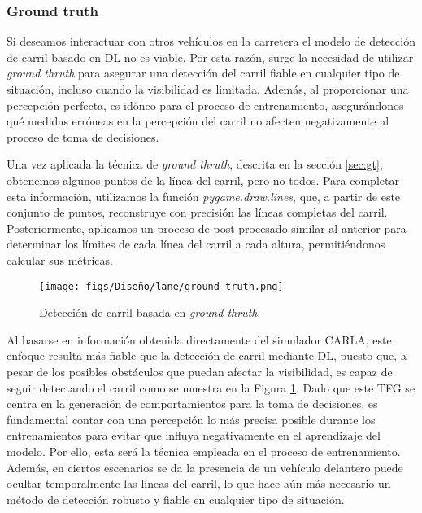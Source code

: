 \subsubsection{Ground truth}

Si deseamos interactuar con otros vehículos en la carretera el modelo de detección de carril basado en \ac{DL} no es viable. Por esta razón, surge la necesidad de utilizar \textit{ground thruth} para asegurar una detección del carril fiable en cualquier tipo de situación, incluso cuando la visibilidad es limitada. Además, al proporcionar una percepción perfecta, es idóneo para el proceso de entrenamiento, asegurándonos qué medidas erróneas en la percepción del carril no afecten negativamente al proceso de toma de decisiones. 

Una vez aplicada la técnica de \textit{ground thruth}, descrita en la sección \ref{sec:gt}, obtenemos algunos puntos de la línea del carril, pero no todos. Para completar esta información, utilizamos la función \textit{pygame.draw.lines}, que, a partir de este conjunto de puntos, reconstruye con precisión las líneas completas del carril. Posteriormente, aplicamos un proceso de post-procesado similar al anterior para determinar los límites de cada línea del carril a cada altura, permitiéndonos calcular sus métricas.

\begin{figure}[ht]
\centering
\texttt{[image: figs/Diseño/lane/ground\_truth.png]}
\caption{Detección de carril basada en \textit{ground thruth}.}
\label{fig:gt_final_carril}
\end{figure}

\newpage

Al basarse en información obtenida directamente del simulador CARLA, este enfoque resulta más fiable que la detección de carril mediante \ac{DL}, puesto que, a pesar de los posibles obstáculos que puedan afectar la visibilidad, es capaz de seguir detectando el carril como se muestra en la Figura \ref{fig:gt_final_carril}. Dado que este \ac{TFG} se centra en la generación de comportamientos para la toma de decisiones, es fundamental contar con una percepción lo más precisa posible durante los entrenamientos para evitar que influya negativamente en el aprendizaje del modelo. Por ello, esta será la técnica empleada en el proceso de entrenamiento. Además, en ciertos escenarios se da la presencia de un vehículo delantero puede ocultar temporalmente las líneas del carril, lo que hace aún más necesario un método de detección robusto y fiable en cualquier tipo de situación.

